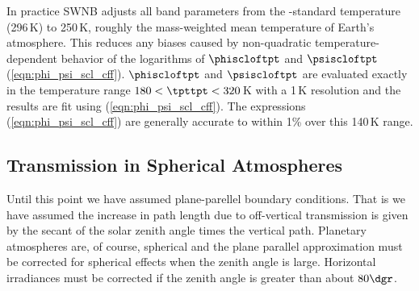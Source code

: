 \documentclass[12pt]{article}
\begin{document}
In practice SWNB adjusts all band parameters from the
-standard temperature (296\,K) to 250\,K, roughly
the mass-weighted mean temperature of Earth's atmosphere.
This reduces any biases caused by non-quadratic temperature-dependent
behavior of the logarithms of $\phiscloftpt$ and $\psiscloftpt$
(\ref{eqn:phi_psi_scl_cff}).
$\phiscloftpt$ and $\psiscloftpt$ are evaluated exactly in the 
temperature range $180 < \tpttpt < 320$\,K with a 1\,K resolution
and the results are fit using (\ref{eqn:phi_psi_scl_cff}).
The expressions (\ref{eqn:phi_psi_scl_cff}) are generally accurate to 
within 1\% over this 140\,K range.

\subsection[Transmission in Spherical Atmospheres]{Transmission in Spherical Atmospheres}\label{sxn:tsa}
Until this point we have assumed plane-parellel boundary conditions.
That is we have assumed the increase in path length due to
off-vertical transmission is given by the secant of the solar zenith
angle times the vertical path. 
Planetary atmospheres are, of course, spherical and the plane parallel
approximation must be corrected for spherical effects when the zenith
angle is large.
Horizontal irradiances must be corrected if the zenith angle is
greater than about $80\dgr$.
\end{document}
